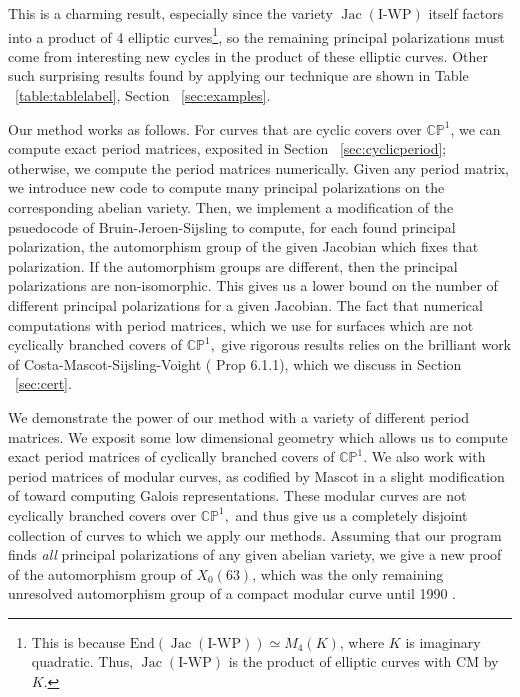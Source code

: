 \documentclass[12pt,reqno]{amsart}
\DeclareMathOperator{\Jac}{Jac}
\newcommand{\C}{\mathbb{C}}
\newcommand{\bb}{\mathbb}
\renewcommand{\P}{\mathbb{P}}
\theoremstyle{definition}
\theoremstyle{remark}
\begin{document}
This is a charming result, especially since the variety $\Jac(\text{I-WP})$ itself factors into a product of 4 elliptic curves\footnote{This is because $\text{End}(\Jac(\text{I-WP})) \simeq M_4(K)$, where $K$ is imaginary quadratic. Thus, $\Jac(\text{I-WP})$ is the product of elliptic curves with CM by $K$.}, so the remaining principal polarizations must come from interesting new cycles in the product of these elliptic curves. Other such surprising results found by applying our technique are shown in Table ~\ref{table:tablelabel}, Section ~\ref{sec:examples}.

Our method works as follows. For curves that are cyclic covers over $\C\bb{P}^1$, we can compute exact period matrices, exposited in Section ~\ref{sec:cyclicperiod}; otherwise, we compute the period matrices numerically. Given any period matrix, we introduce new code to compute many principal polarizations on the corresponding abelian variety.  Then, we implement a modification of the psuedocode of Bruin-Jeroen-Sijsling \cite{numerical} to compute, for each found principal polarization, the automorphism group of the given Jacobian which fixes that polarization. If the automorphism groups are different, then the principal polarizations are non-isomorphic. This gives us a lower bound on the number of different principal polarizations for a given Jacobian. The fact that numerical computations with period matrices, which we use for surfaces which are not cyclically branched covers of $\C\P^1,$ give rigorous results relies on the brilliant work of Costa-Mascot-Sijsling-Voight (\cite{rigor} Prop 6.1.1), which we discuss in Section ~\ref{sec:cert}.

We demonstrate the power of our method with a variety of different period matrices. We exposit some low dimensional geometry which allows us to compute exact period matrices of cyclically branched covers of $\C\P^1.$ We also work with period matrices of modular curves, as codified by Mascot in a slight modification of \cite{n} toward computing Galois representations. These modular curves are not cyclically branched covers over $\C\P^1,$ and thus give us a completely disjoint collection of curves to which we apply our methods. Assuming that our program finds \textit{all} principal polarizations of any given abelian variety, we give a new proof of the automorphism group of $X_0(63)$, which was the only remaining unresolved automorphism group of a compact modular curve until 1990 \cite{elkies}.  
\end{document}
